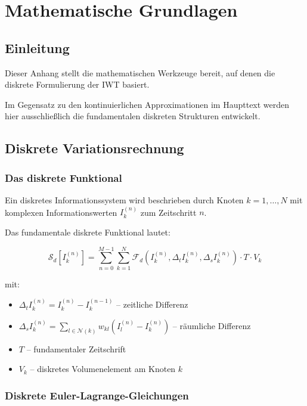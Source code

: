 \chapter{Mathematische Grundlagen}

\section{Einleitung}

Dieser Anhang stellt die mathematischen Werkzeuge bereit, auf denen die diskrete Formulierung der IWT basiert.

Im Gegensatz zu den kontinuierlichen Approximationen im Haupttext werden hier ausschließlich die fundamentalen diskreten Strukturen entwickelt.

\section{Diskrete Variationsrechnung}

\subsection{Das diskrete Funktional}

Ein diskretes Informationssystem wird beschrieben durch Knoten \( k = 1, \dots, N \) mit komplexen Informationswerten \( I_k^{(n)} \) zum Zeitschritt \( n \).

Das fundamentale diskrete Funktional lautet:

\[
\mathcal{S}_d[I_k^{(n)}] = \sum_{n=0}^{M-1} \sum_{k=1}^{N} \mathcal{F}_d\left(I_k^{(n)}, \Delta_t I_k^{(n)}, \Delta_s I_k^{(n)}\right) \cdot T \cdot V_k
\]

mit:
\begin{itemize}
\item \( \Delta_t I_k^{(n)} = I_k^{(n)} - I_k^{(n-1)} \) – zeitliche Differenz
\item \( \Delta_s I_k^{(n)} = \sum_{l \in \mathcal{N}(k)} w_{kl}(I_l^{(n)} - I_k^{(n)}) \) – räumliche Differenz
\item \( T \) – fundamentaler Zeitschrift
\item \( V_k \) – diskretes Volumenelement am Knoten \( k \)
\end{itemize}

\subsection{Diskrete Euler-Lagrange-Gleichungen}

